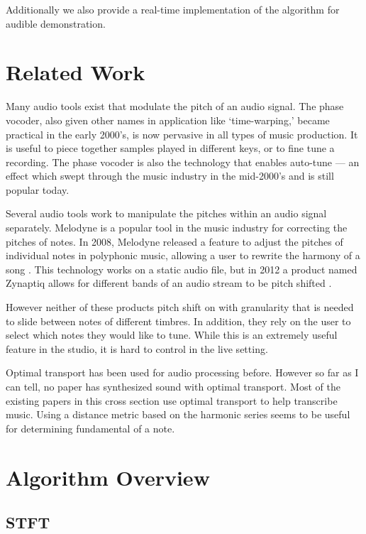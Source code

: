 \documentclass[12pt]{article}
\begin{document}
Additionally we also provide a real-time implementation of the algorithm for audible demonstration.

\section{Related Work}

Many audio tools exist that modulate the pitch of an audio signal.
The phase vocoder, also given other names in application like `time-warping,' became practical in the early 2000's, is now pervasive in all types of music production\cite{vocoder}\cite{ableton}. It is useful to piece together samples played in different keys, or to fine tune a recording.
The phase vocoder is also the technology that enables auto-tune --- an effect which swept through the music industry in the mid-2000's and is still popular today.

Several audio tools work to manipulate the pitches within an audio signal separately.
Melodyne is a popular tool in the music industry for correcting the pitches of notes.
In 2008, Melodyne released a feature to adjust the pitches of individual notes in polyphonic music, allowing a user to rewrite the harmony of a song
\cite{melodyne}.
This technology works on a static audio file, but in 2012 a product named Zynaptiq allows for different bands of an audio stream to be pitch shifted
\cite{zynaptiq}.

However neither of these products pitch shift on with granularity that is needed to slide between notes of different timbres.
In addition, they rely on the user to select which notes they would like to tune.
While this is an extremely useful feature in the studio, it is hard to control in the live setting. 

Optimal transport has been used for audio processing before.
However so far as I can tell, no paper has synthesized sound with optimal transport.
Most of the existing papers in this cross section use optimal transport to help transcribe music.
Using a distance metric based on the harmonic series seems to be useful for determining fundamental of a note\cite{musictransport1}\cite{musictransport2}.

\section{Algorithm Overview}

\subsection{STFT}
\end{document}
